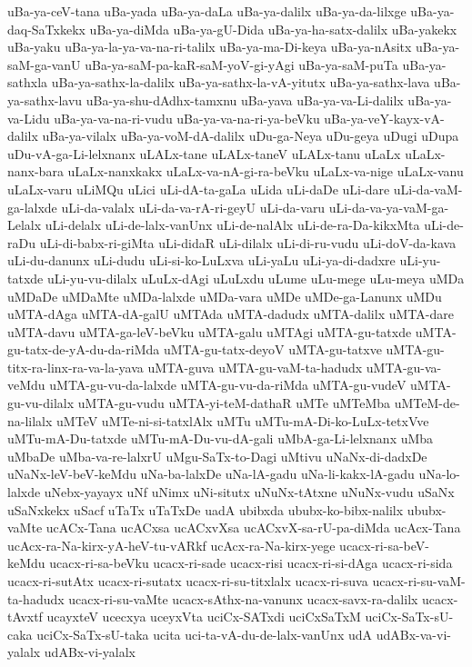 {uBa-ya-ceV-tana
uBa-yada
uBa-ya-daLa
uBa-ya-dalilx
uBa-ya-da-lilxge
uBa-ya-daq-SaTxkekx
uBa-ya-diMda
uBa-ya-gU-Dida
uBa-ya-ha-satx-dalilx
uBa-yakekx
uBa-yaku
uBa-ya-la-ya-va-na-ri-talilx
uBa-ya-ma-Di-keya
uBa-ya-nAsitx
uBa-ya-saM-ga-vanU
uBa-ya-saM-pa-kaR-saM-yoV-gi-yAgi
uBa-ya-saM-puTa
uBa-ya-sathxla
uBa-ya-sathx-la-dalilx
uBa-ya-sathx-la-vA-yitutx
uBa-ya-sathx-lava
uBa-ya-sathx-lavu
uBa-ya-shu-dAdhx-tamxnu
uBa-yava
uBa-ya-va-Li-dalilx
uBa-ya-va-Lidu
uBa-ya-va-na-ri-vudu
uBa-ya-va-na-ri-ya-beVku
uBa-ya-veY-kayx-vA-dalilx
uBa-ya-vilalx
uBa-ya-voM-dA-dalilx
uDu-ga-Neya
uDu-geya
uDugi
uDupa
uDu-vA-ga-Li-lelxnanx
uLALx-tane
uLALx-taneV
uLALx-tanu
uLaLx
uLaLx-nanx-bara
uLaLx-nanxkakx
uLaLx-va-nA-gi-ra-beVku
uLaLx-va-nige
uLaLx-vanu
uLaLx-varu
uLiMQu
uLici
uLi-dA-ta-gaLa
uLida
uLi-daDe
uLi-dare
uLi-da-vaM-ga-lalxde
uLi-da-valalx
uLi-da-va-rA-ri-geyU
uLi-da-varu
uLi-da-va-ya-vaM-ga-Lelalx
uLi-delalx
uLi-de-lalx-vanUnx
uLi-de-nalAlx
uLi-de-ra-Da-kikxMta
uLi-de-raDu
uLi-di-babx-ri-giMta
uLi-didaR
uLi-dilalx
uLi-di-ru-vudu
uLi-doV-da-kava
uLi-du-danunx
uLi-dudu
uLi-si-ko-LuLxva
uLi-yaLu
uLi-ya-di-dadxre
uLi-yu-tatxde
uLi-yu-vu-dilalx
uLuLx-dAgi
uLuLxdu
uLume
uLu-mege
uLu-meya
uMDa
uMDaDe
uMDaMte
uMDa-lalxde
uMDa-vara
uMDe
uMDe-ga-Lanunx
uMDu
uMTA-dAga
uMTA-dA-galU
uMTAda
uMTA-dadudx
uMTA-dalilx
uMTA-dare
uMTA-davu
uMTA-ga-leV-beVku
uMTA-galu
uMTAgi
uMTA-gu-tatxde
uMTA-gu-tatx-de-yA-du-da-riMda
uMTA-gu-tatx-deyoV
uMTA-gu-tatxve
uMTA-gu-titx-ra-linx-ra-va-la-yava
uMTA-guva
uMTA-gu-vaM-ta-hadudx
uMTA-gu-va-veMdu
uMTA-gu-vu-da-lalxde
uMTA-gu-vu-da-riMda
uMTA-gu-vudeV
uMTA-gu-vu-dilalx
uMTA-gu-vudu
uMTA-yi-teM-dathaR
uMTe
uMTeMba
uMTeM-de-na-lilalx
uMTeV
uMTe-ni-si-tatxlAlx
uMTu
uMTu-mA-Di-ko-LuLx-tetxVve
uMTu-mA-Du-tatxde
uMTu-mA-Du-vu-dA-gali
uMbA-ga-Li-lelxnanx
uMba
uMbaDe
uMba-va-re-lalxrU
uMgu-SaTx-to-Dagi
uMtivu
uNaNx-di-dadxDe
uNaNx-leV-beV-keMdu
uNa-ba-lalxDe
uNa-lA-gadu
uNa-li-kakx-lA-gadu
uNa-lo-lalxde
uNebx-yayayx
uNf
uNimx
uNi-situtx
uNuNx-tAtxne
uNuNx-vudu
uSaNx
uSaNxkekx
uSacf
uTaTx
uTaTxDe
uadA
ubibxda
ububx-ko-bibx-nalilx
ububx-vaMte
ucACx-Tana
ucACxsa
ucACxvXsa
ucACxvX-sa-rU-pa-diMda
ucAcx-Tana
ucAcx-ra-Na-kirx-yA-heV-tu-vARkf
ucAcx-ra-Na-kirx-yege
ucacx-ri-sa-beV-keMdu
ucacx-ri-sa-beVku
ucacx-ri-sade
ucacx-risi
ucacx-ri-si-dAga
ucacx-ri-sida
ucacx-ri-sutAtx
ucacx-ri-sutatx
ucacx-ri-su-titxlalx
ucacx-ri-suva
ucacx-ri-su-vaM-ta-hadudx
ucacx-ri-su-vaMte
ucacx-sAthx-na-vanunx
ucacx-savx-ra-dalilx
ucacx-tAvxtf
ucayxteV
ucecxya
uceyxVta
uciCx-SATxdi
uciCxSaTxM
uciCx-SaTx-sU-caka
uciCx-SaTx-sU-taka
ucita
uci-ta-vA-du-de-lalx-vanUnx
udA
udABx-va-vi-yalalx
udABx-vi-yalalx
}
